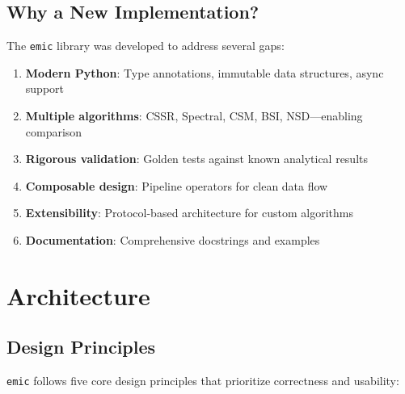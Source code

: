 \documentclass[11pt,a4paper]{report}
\theoremstyle{definition}
\theoremstyle{plain}
\newcommand{\emic}{\texttt{emic}}
\begin{document}
\section{Why a New Implementation?}

The \emic{} library was developed to address several gaps:

\begin{enumerate}
    \item \textbf{Modern Python}: Type annotations, immutable data structures, async support
    \item \textbf{Multiple algorithms}: CSSR, Spectral, CSM, BSI, NSD---enabling comparison
    \item \textbf{Rigorous validation}: Golden tests against known analytical results
    \item \textbf{Composable design}: Pipeline operators for clean data flow
    \item \textbf{Extensibility}: Protocol-based architecture for custom algorithms
    \item \textbf{Documentation}: Comprehensive docstrings and examples
\end{enumerate}

\chapter{Architecture}
\label{ch:architecture}

\section{Design Principles}

\emic{} follows five core design principles that prioritize correctness and usability:
\end{document}
